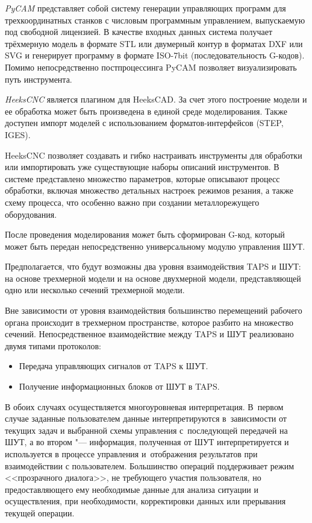 \textit{PyCAM} представляет собой систему генерации управляющих программ для трехкоординатных станков с числовым программным управлением, выпускаемую под свободной лицензией. В качестве входных данных система получает трёхмерную модель в формате STL или двумерный контур в форматах DXF или SVG и генерирует программу в формате ISO-7bit (последовательность G-кодов). Помимо непосредственно постпроцессинга PyCAM позволяет визуализировать путь инструмента.

\textit{HeeksCNC} является плагином для HeeksCAD. За счет этого построение модели и ее обработка может быть произведена в единой среде моделирования. Также доступен импорт моделей с использованием форматов-интерфейсов (STEP, IGES).

HeeksCNC позволяет создавать и гибко настраивать инструменты для обработки или импортировать уже существующие наборы описаний инструментов. В системе представлено множество параметров, которые описывают процесс обработки, включая множество детальных настроек режимов резания, а также схему процесса, что особенно важно при создании металлорежущего оборудования.

После проведения моделирования может быть сформирован G-код, который может быть передан непосредственно универсальному модулю управления ШУТ.

Предполагается, что будут возможны два уровня взаимодействия \foreignlanguage{english}{TAPS} и ШУТ: на основе трехмерной модели и на основе двухмерной модели, представляющей одно или несколько сечений трехмерной модели.

Вне зависимости от уровня взаимодействия большинство перемещений рабочего органа происходит в трехмерном пространстве, которое разбито на множество сечений. Непосредственное взаимодействие между TAPS и ШУТ реализовано двумя типами протоколов:

\begin{itemize}
	\item Передача управляющих сигналов от TAPS к ШУТ.
	
	\item Получение информационных блоков от ШУТ в TAPS.
\end{itemize}


В обоих случаях осуществляется многоуровневая интерпретация. В~первом случае заданные пользователем данные интерпретируются в~зависимости от текущих задач и выбранной схемы управления с~последующей передачей на ШУТ, а во втором "--- информация, полученная от ШУТ интерпретируется и используется в процессе управления и~отображения результатов при взаимодействии с пользователем. Большинство операций поддерживает режим <<прозрачного диалога>>, не требующего участия пользователя, но предоставляющего ему необходимые данные для анализа ситуации и осуществления, при необходимости, корректировки данных или прерывания текущей операции.

